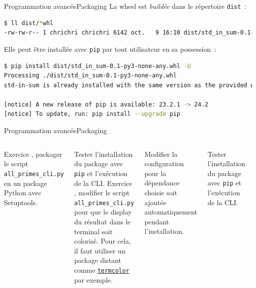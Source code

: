 \documentclass{beamer}
\begin{document}
    \begin{frame}[fragile]{Programmation avancée}{Packaging}
        La wheel est \textit{buildée} dans le répertoire \lstinline{dist}~:
        \begin{lstlisting}[language=bash]
$ ll dist/*whl
-rw-rw-r-- 1 chrichri chrichri 6142 oct.   9 16:10 dist/std_in_sum-0.1-py3-none-any.whl
        \end{lstlisting}
        \bigbreak
        Elle peut être installée avec \lstinline{pip} par tout utilisateur en sa possession~:
        \begin{lstlisting}[language=bash]
$ pip install dist/std_in_sum-0.1-py3-none-any.whl -U
Processing ./dist/std_in_sum-0.1-py3-none-any.whl
std-in-sum is already installed with the same version as the provided wheel. Use --force-reinstall to force an installation of the wheel.

[notice] A new release of pip is available: 23.2.1 -> 24.2
[notice] To update, run: pip install --upgrade pip
        \end{lstlisting}
    \end{frame}

    \begin{frame}{Programmation avancée}{Packaging}
        \begin{columns}
            Exercice \execcounterdispinc{}, packager le script \lstinline{all_primes_cli.py} en un package Python avec Setuptools.

            Tester l'installation du package avec \lstinline{pip} et l'exécution de la CLI.
            \bigbreak
            Exercice \execcounterdispinc{}, modifier le script \lstinline{all_primes_cli.py} pour que le display du résultat dans le terminal soit colorisé.
            Pour cela, il faut utiliser un package distant comme \href{https://pypi.org/project/termcolor/}{\lstinline{termcolor}} par exemple.

            Modifier la configuration pour la dépendance choisie soit ajoutée automatiquement pendant l'installation.

            Tester l'installation du package avec \lstinline{pip} et l'exécution de la CLI.
            \begin{center}
                \includegraphics[width=4cm]{image/python-luggage}
            \end{center}
        \end{columns}
    \end{frame}
\end{document}
